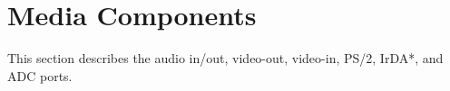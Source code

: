 







\section{Media Components}
\label{sec:multi}

This section describes the audio in/out, video-out, video-in, PS/2, IrDA*, and ADC ports.











